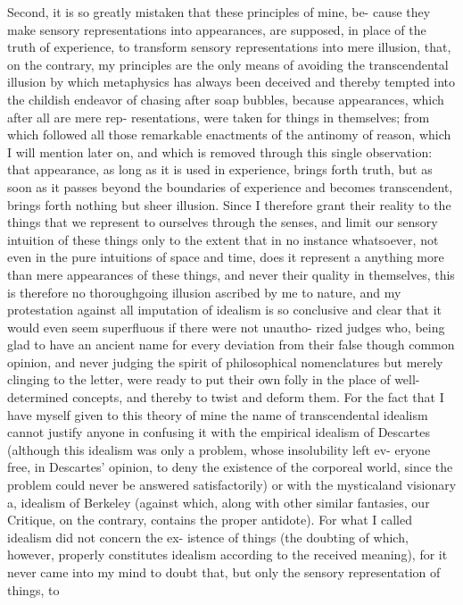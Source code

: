 Second, it is so greatly mistaken that these principles of mine, be-
cause they make sensory representations into appearances, are supposed,
in place of the truth of experience, to transform sensory representations
into mere illusion, that, on the contrary, my principles are the only means
of avoiding the transcendental illusion by which metaphysics has always
been deceived and thereby tempted into the childish endeavor of chasing
after soap bubbles, because appearances, which after all are mere rep-
resentations, were taken for things in themselves; from which followed
all those remarkable enactments of the antinomy of reason, which I will
mention later on, and which is removed through this single observation:
that appearance, as long as it is used in experience, brings forth truth, but
as soon as it passes beyond the boundaries of experience and becomes
transcendent, brings forth nothing but sheer illusion.
Since I therefore grant their reality to the things that we represent
to ourselves through the senses, and limit our sensory intuition of these
things only to the extent that in no instance whatsoever, not even in the
pure intuitions of space and time, does it represent a anything more than
mere appearances of these things, and never their quality in themselves,
this is therefore no thoroughgoing illusion ascribed by me to nature,
and my protestation against all imputation of idealism is so conclusive
and clear that it would even seem superﬂuous if there were not unautho-
rized judges who, being glad to have an ancient name for every deviation
from their false though common opinion, and never judging the spirit
of philosophical nomenclatures but merely clinging to the letter, were
ready to put their own folly in the place of well-determined concepts,
and thereby to twist and deform them. For the fact that I have myself
given to this theory of mine the name of transcendental idealism cannot
justify anyone in confusing it with the empirical idealism of Descartes
(although this idealism was only a problem, whose insolubility left ev-
eryone free, in Descartes’ opinion, to deny the existence of the corporeal
world, since the problem could never be answered satisfactorily) or with
the mysticaland visionary a, idealism of Berkeley (against which, along
with other similar fantasies, our Critique, on the contrary, contains the
proper antidote). For what I called idealism did not concern the ex-
istence of things (the doubting of which, however, properly constitutes
idealism according to the received meaning), for it never came into my
mind to doubt that, but only the sensory representation of things, to
